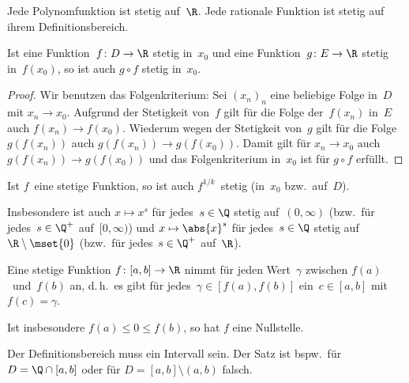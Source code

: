 \documentclass[a4paper]{article}
\begin{document}
\begin{corollary}
    Jede Polynomfunktion ist stetig auf~$\R$. Jede rationale Funktion ist stetig auf ihrem Definitionsbereich.
\end{corollary}

\begin{proposition}
    Ist eine Funktion~$f\colon D \to \R$ stetig in~$x_0$ und eine Funktion~$g\colon E \to \R$ stetig in~$f(x_0)$, so ist auch $g\circ f$ stetig in~$x_0$.
\end{proposition}

\begin{proof}
    Wir benutzen das Folgenkriterium: Sei $(x_n)_n$ eine beliebige Folge in~$D$ mit $x_n \to x_0$. Aufgrund der Stetigkeit von~$f$ gilt für die Folge der~$f(x_n)$ in~$E$ auch $f(x_n) \to f(x_0)$. Wiederum wegen der Stetigkeit von~$g$ gilt für die Folge $g(f(x_n))$ auch $g(f(x_n)) \to g(f(x_0))$. Damit gilt für $x_n \to x_0$ auch $g(f(x_n)) \to g(f(x_0))$ und das Folgenkriterium in~$x_0$ ist für $g\circ f$ erfüllt.
\end{proof}

\begin{corollary}
    Ist $f$~eine stetige Funktion, so ist auch $f^{1/k}$~stetig (in~$x_0$ bzw.\ auf~$D$).

    Insbesondere ist auch $x \mapsto x^s$ für jedes~$s \in \Q$ stetig auf~$(0,\infty)$ (bzw.\ für jedes~$s \in \Q^+$ auf~$[0,\infty)$) und $x \mapsto \abs{x}^s$ für jedes~$s \in \Q$ stetig auf $\R \setminus \mset{0}$ (bzw.\ für jedes~$s \in \Q^+$ auf~$\R$).
\end{corollary}


\begin{theorem}[Zwischenwertsatz]
    Eine stetige Funktion $f\colon [a,b] \to \R$ nimmt für jeden Wert~$\gamma$ zwischen $f(a)$~und~$f(b)$ an, d.\,h.\ es gibt für jedes~$\gamma \in [f(a),f(b)]$ ein~$c \in [a,b]$ mit $f(c) = \gamma$.

    Ist insbesondere $f(a) \leq 0 \leq f(b)$, so hat $f$ eine Nullstelle.
\end{theorem}

\begin{remark}
    Der Definitionsbereich muss ein Intervall sein. Der Satz ist bspw.\ für $D = \Q \cap [a,b]$ oder für $D = [a,b] \setminus (a,b)$ falsch.
\end{remark}
\end{document}
